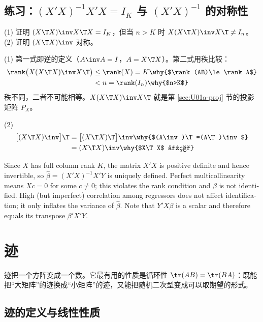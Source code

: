 \subsection{练习：\texorpdfstring{$(X'X)^{-1}X'X=I_K$}{(X'X)\^{}-1 X'X = I} 与 \texorpdfstring{$(X'X)^{-1}$}{(X'X)\^{}-1} 的对称性}

\begin{prac}[逆与对称]\label{pr:U01a-inv}
(1) 证明 $(X\T X)\inv X\T X=I_K$，但当 $n>K$ 时 $X(X\T X)\inv X\T\neq I_n$。(2) 证明 $(X\T X)\inv$ 对称。

\answer (1) 第一式即逆的定义（$A\inv A=I$，$A=X\T X$）。第二式用秩比较：
\begin{align*}
\rank\big(X(X\T X)\inv X\T\big) &\le \rank(X)=K \why{$\rank(AB)\le\rank A$}\\
&< n=\rank(I_n) \why{$n>K$}
\end{align*}
秩不同，二者不可能相等。$X(X\T X)\inv X\T$ 就是第 \ref{sec:U01a-proj} 节的投影矩阵 $P_X$。

(2)
\begin{align*}
\big[(X\T X)\inv\big]\T &= \big[(X\T X)\T\big]\inv \why{$(A\inv)\T=(A\T)\inv$}\\
&= (X\T X)\inv \why{$X\T X$ 对称}
\end{align*}
\end{prac}

\begin{english}
Since $X$ has full column rank $K$, the matrix $X'X$ is positive definite and hence invertible, so $\hat\beta=(X'X)^{-1}X'Y$ is uniquely defined. Perfect multicollinearity means $Xc=0$ for some $c\neq0$; this violates the rank condition and $\beta$ is not identified. High (but imperfect) correlation among regressors does not affect identification; it only inflates the variance of $\hat\beta$. Note that $Y'X\beta$ is a scalar and therefore equals its transpose $\beta'X'Y$.
\end{english}

\section{迹}\label{sec:U01a-trace}

迹把一个方阵变成一个数。它最有用的性质是循环性 $\tr(AB)=\tr(BA)$：既能把“大矩阵”的迹换成“小矩阵”的迹，又能把随机二次型变成可以取期望的形式。

\subsection{迹的定义与线性性质}

